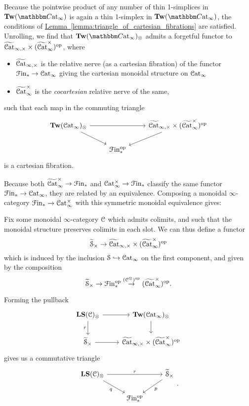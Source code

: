 \documentclass[main.tex]{subfiles}
\begin{document}
Because the pointwise product of any number of thin 1-simplices in $\Tw(\ICCat)$ is again a thin 1-simplex in $\Tw(\ICCat)$, the conditions of \hyperref[lemma:triangle_of_cartesian_fibrations]{Lemma~\ref*{lemma:triangle_of_cartesian_fibrations}} are satisfied. Unrolling, we find that $\Tw(\ICCat)_{\otimes}$ admits a forgetful functor to $\widetilde{\mathcal{C}\mathrm{at}}_{\infty,\times} \times (\widetilde{\mathcal{C}\mathrm{at}}_{\infty}^{\times})^{\mathrm{op}}$, where
\begin{itemize}
  \item $\widetilde{\mathcal{C}\mathrm{at}}_{\infty,\times}$ is the relative nerve (as a cartesian fibration) of the functor $\mathcal{F}\mathrm{in}_{*} \to \mathcal{C}\mathrm{at}_{\infty}$ giving the cartesian monoidal structure on $\mathcal{C}\mathrm{at}_{\infty}$

  \item $\widetilde{\mathcal{C}\mathrm{at}}_{\infty}^{\times}$ is the \emph{cocartesian} relative nerve of the same,
\end{itemize}
such that each map in the commuting triangle
\begin{equation}
  \label{eq:base_triangle}
  \begin{tikzcd}
    \Tw(\ICat)_{\otimes}
    \arrow[rr]
    \arrow[dr]
    && \TICatCart \times (\TICatCocart)\op
    \arrow[dl]
    \\
    & \Finp\op
  \end{tikzcd}
\end{equation}
is a cartesian fibration.

Because both $\widetilde{\mathcal{C}\mathrm{at}}_{\infty}^{\times} \to \mathcal{F}\mathrm{in}_{*}$ and $\mathcal{C}\mathrm{at}_{\infty}^{\times} \to \mathcal{F}\mathrm{in}_{*}$ classify the same functor $\mathcal{F}\mathrm{in}_{*} \to \mathcal{C}\mathrm{at}_{\infty}$, they are related by an equivalence. Composing a monoidal $\infty$-category $\mathcal{F}\mathrm{in}_{*} \to \mathcal{C}\mathrm{at}_{\infty}^{\times}$ with this symmetric monoidal equivalence gives:

Fix some monoidal $\infty$-category $\mathcal{C}$ which admits colimits, and such that the monoidal structure preserves colimits in each slot. We can thus define a functor
\begin{equation*}
  \widetilde{\mathcal{S}}_{\times} \to \widetilde{\mathcal{C}\mathrm{at}}_{\infty,\times} \times (\widetilde{\mathcal{C}\mathrm{at}}_{\infty}^{\times})^{\mathrm{op}}
\end{equation*}
which is induced by the inclusion $\mathcal{S} \hookrightarrow \mathcal{C}\mathrm{at}_{\infty}$ on the first component, and given by the composition
\begin{equation*}
  \widetilde{\mathcal{S}}_{\times} \to \mathcal{F}\mathrm{in}_{*}^{\mathrm{op}} \overset{(\mathcal{C}^{\otimes})^{\mathrm{op}}}{\to} (\widetilde{\mathcal{C}\mathrm{at}}_{\infty}^{\times})^{\mathrm{op}}.
\end{equation*}

Forming the pullback
\begin{equation*}
  \begin{tikzcd}
    \LS(\category{C})_{\otimes}
    \arrow[r]
    \arrow[d, swap, "r"]
    & \Tw(\ICat)_{\otimes}
    \arrow[d]
    \\
    \TSCart
    \arrow[r]
    & \TICatCart \times (\TICatCocart)\op
  \end{tikzcd}
\end{equation*}
gives us a commutative triangle
\begin{equation*}
  \begin{tikzcd}
    \LS(\category{C})_{\otimes}
    \arrow[rr, "r"]
    \arrow[dr, swap, "q"]
    && \TSCart
    \arrow[dl, "p"]
    \\
    & \Finp\op
  \end{tikzcd}.
\end{equation*}
\end{document}
